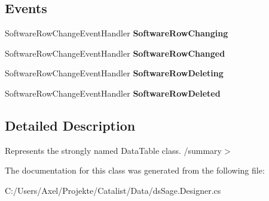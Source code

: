 \subsection*{Events}
\begin{DoxyCompactItemize}
\item 
Software\+Row\+Change\+Event\+Handler {\bfseries Software\+Row\+Changing}\hypertarget{class_products_1_1_data_1_1ds_sage_1_1_software_data_table_a1728e61a13178a46040e31f5eb6f81aa}{}\label{class_products_1_1_data_1_1ds_sage_1_1_software_data_table_a1728e61a13178a46040e31f5eb6f81aa}

\item 
Software\+Row\+Change\+Event\+Handler {\bfseries Software\+Row\+Changed}\hypertarget{class_products_1_1_data_1_1ds_sage_1_1_software_data_table_a009c6cc5b8232bd7e3a57936b69bcf2d}{}\label{class_products_1_1_data_1_1ds_sage_1_1_software_data_table_a009c6cc5b8232bd7e3a57936b69bcf2d}

\item 
Software\+Row\+Change\+Event\+Handler {\bfseries Software\+Row\+Deleting}\hypertarget{class_products_1_1_data_1_1ds_sage_1_1_software_data_table_af1cba9cd0e5a3e82acef3e1c41e3837e}{}\label{class_products_1_1_data_1_1ds_sage_1_1_software_data_table_af1cba9cd0e5a3e82acef3e1c41e3837e}

\item 
Software\+Row\+Change\+Event\+Handler {\bfseries Software\+Row\+Deleted}\hypertarget{class_products_1_1_data_1_1ds_sage_1_1_software_data_table_a04553e4e9f19761ebe26888b69eb68ea}{}\label{class_products_1_1_data_1_1ds_sage_1_1_software_data_table_a04553e4e9f19761ebe26888b69eb68ea}

\end{DoxyCompactItemize}


\subsection{Detailed Description}
Represents the strongly named Data\+Table class. /summary$>$ 

The documentation for this class was generated from the following file\+:\begin{DoxyCompactItemize}
\item 
C\+:/\+Users/\+Axel/\+Projekte/\+Catalist/\+Data/ds\+Sage.\+Designer.\+cs\end{DoxyCompactItemize}

